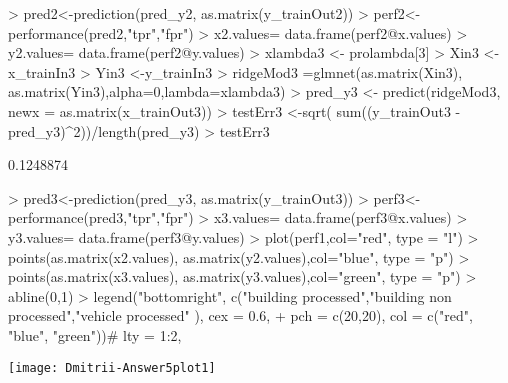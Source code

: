 \documentclass{article}
\begin{document}
\begin{Schunk}
\begin{Sinput}
> pred2<-prediction(pred_y2, as.matrix(y_trainOut2))
> perf2<-performance(pred2,"tpr","fpr")
> x2.values= data.frame(perf2@x.values)
> y2.values= data.frame(perf2@y.values)
> xlambda3 <- prolambda[3]
> Xin3 <-x_trainIn3
> Yin3 <-y_trainIn3
> ridgeMod3 =glmnet(as.matrix(Xin3), as.matrix(Yin3),alpha=0,lambda=xlambda3)
> pred_y3 <- predict(ridgeMod3, newx = as.matrix(x_trainOut3))
> testErr3 <-sqrt( sum((y_trainOut3 - pred_y3)^2))/length(pred_y3)
> testErr3 
\end{Sinput}
\begin{Soutput}
[1] 0.1248874
\end{Soutput}
\end{Schunk}

\begin{Schunk}
\begin{Sinput}
> pred3<-prediction(pred_y3, as.matrix(y_trainOut3))
> perf3<-performance(pred3,"tpr","fpr")
> x3.values= data.frame(perf3@x.values)
> y3.values= data.frame(perf3@y.values)
> plot(perf1,col="red", type = "l") 
> points(as.matrix(x2.values), as.matrix(y2.values),col="blue", type = "p") 
> points(as.matrix(x3.values), as.matrix(y3.values),col="green", type = "p") 
> abline(0,1)
> legend("bottomright", c("building processed","building non processed","vehicle processed" ), cex = 0.6, 
+        pch = c(20,20), col = c("red", "blue", "green"))# lty = 1:2,
\end{Sinput}
\end{Schunk}
\texttt{[image: Dmitrii-Answer5plot1]}
\end{document}
